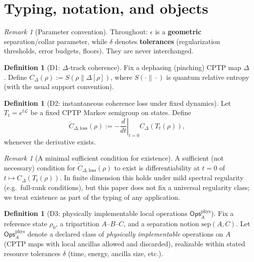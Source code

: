 \documentclass[11pt]{article}
\theoremstyle{definition}
\newtheorem{definition}[theorem]{Definition}
\theoremstyle{remark}
\newtheorem{remark}[theorem]{Remark}
\newcommand{\Ops}{\mathsf{Ops}^{\mathrm{phys}}_A}
\begin{document}
\section{Typing, notation, and objects}

\begin{remark}[Parameter convention]
\label{rem:params}
Throughout: $\epsilon$ is a \textbf{geometric} separation/collar
parameter, while $\delta$ denotes \textbf{tolerances} (regularization
thresholds, error budgets, floors). They are never interchanged.
\end{remark}

\begin{definition}[D1: $\Delta$-track coherence]
\label{def:cdelta}
Fix a dephasing (pinching) CPTP map $\Delta$. Define $C_\Delta(\rho) :=
S(\rho \| \Delta[\rho])$, where $S(\cdot\|\cdot)$ is quantum relative
entropy (with the usual support convention).
\end{definition}

\begin{definition}[D2: instantaneous coherence loss under fixed
dynamics]
\label{def:loss}
Let $T_t = e^{t\mathcal{L}}$ be a fixed CPTP Markov semigroup on states.
Define
\[
\dot{C}_{\Delta,\mathrm{loss}}(\rho) := -\left.\frac{d}{dt}\right|_{t=0}
C_\Delta(T_t(\rho)),
\]
whenever the derivative exists.
\end{definition}

\begin{remark}[A minimal sufficient condition for existence]
\label{rem:exist}
A sufficient (not necessary) condition for
$\dot{C}_{\Delta,\mathrm{loss}}(\rho)$ to exist is differentiability at
$t = 0$ of $t \mapsto C_\Delta(T_t(\rho))$. In finite dimension this
holds under mild spectral regularity (e.g.\ full-rank conditions), but
this paper does not fix a universal regularity class; we treat existence
as part of the typing of any application.
\end{remark}

\begin{definition}[D3: physically implementable local operations $\Ops$]
\label{def:ops}
Fix a reference state $\rho_0$, a tripartition $A$--$B$--$C$, and a
separation notion $\mathrm{sep}(A, C)$. Let $\Ops$ denote a declared
class of \emph{physically implementable} operations on $A$ (CPTP maps
with local ancillas allowed and discarded), realizable within stated
resource tolerances $\delta$ (time, energy, ancilla size, etc.).
\end{definition}
\end{document}
